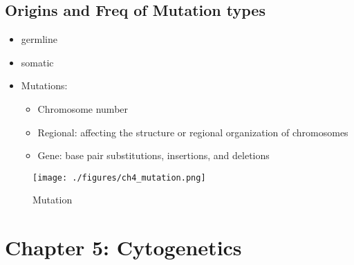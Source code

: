 \documentclass{scrartcl}
\begin{document}
\subsection{Origins and Freq of Mutation types}
\label{sec:org41785bf}
\begin{itemize}
\item germline
\item somatic
\item Mutations:
\begin{itemize}
\item Chromosome number
\item Regional: affecting the structure or regional organization of chromosomes
\item Gene: base pair substitutions, insertions, and deletions
\end{itemize}
\end{itemize}

\begin{figure}[htbp]
\centering
\texttt{[image: ./figures/ch4\_mutation.png]}
\caption{\label{fig:orgbcd6aca}
Mutation}
\end{figure}

\section{Chapter 5: Cytogenetics}
\label{sec:org07aeb06}
\end{document}
